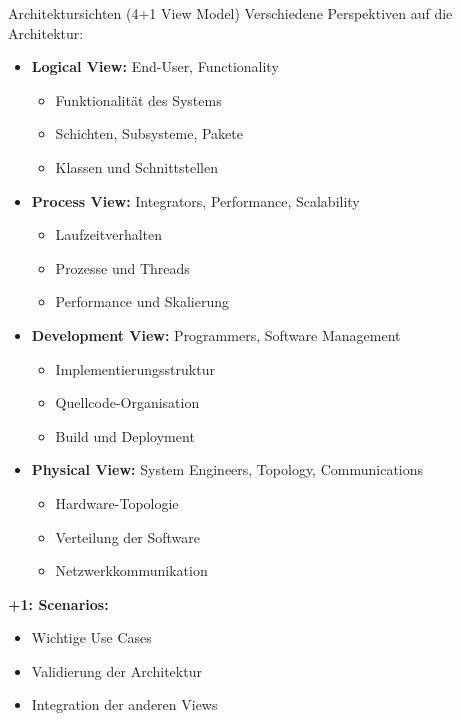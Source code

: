 \begin{concept}{Architektursichten (4+1 View Model)}
Verschiedene Perspektiven auf die Architektur:

\begin{itemize}
    \item \textbf{Logical View:} End-User, Functionality
    \begin{itemize}
        \item Funktionalität des Systems
        \item Schichten, Subsysteme, Pakete
        \item Klassen und Schnittstellen
    \end{itemize}
    
    \item \textbf{Process View:} Integrators, Performance, Scalability
    \begin{itemize}
        \item Laufzeitverhalten
        \item Prozesse und Threads
        \item Performance und Skalierung
    \end{itemize}

    \item \textbf{Development View:} Programmers, Software Management
    \begin{itemize}
        \item Implementierungsstruktur
        \item Quellcode-Organisation
        \item Build und Deployment
    \end{itemize}
    
    \item \textbf{Physical View:} System Engineers, Topology, Communications
    \begin{itemize}
        \item Hardware-Topologie
        \item Verteilung der Software
        \item Netzwerkkommunikation
    \end{itemize}
\end{itemize}
    
\textbf{+1: Scenarios:}
    \begin{itemize}
        \item Wichtige Use Cases
        \item Validierung der Architektur
        \item Integration der anderen Views
    \end{itemize}


\end{concept}
